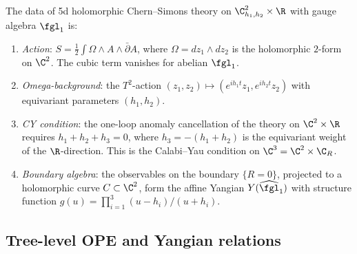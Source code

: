\begin{proposition}
\label{prop:5d-hcs-specification}
The data of 5d holomorphic Chern--Simons theory on $\C^2_{h_1,h_2} \times \R$ with gauge algebra $\fgl_1$ is:
\begin{enumerate}[label=\textup{(\alph*)}]
 \item \emph{Action}: $S = \frac{1}{2}\int \Omega \wedge A \wedge \bar{\partial}A$, where $\Omega = dz_1 \wedge dz_2$ is the holomorphic $2$-form on $\C^2$. The cubic term vanishes for abelian $\fgl_1$.
 \item \emph{Omega-background}: the $T^2$-action $(z_1, z_2) \mapsto (e^{ih_1 t}z_1, e^{ih_2 t}z_2)$ with equivariant parameters $(h_1, h_2)$.
 \item \emph{CY condition}: the one-loop anomaly cancellation of the theory on $\C^2 \times \R$ requires $h_1 + h_2 + h_3 = 0$, where $h_3 = -(h_1 + h_2)$ is the equivariant weight of the $\R$-direction. This is the Calabi--Yau condition on $\C^3 = \C^2 \times \C_R$.
 \item \emph{Boundary algebra}: the observables on the boundary $\{R = 0\}$, projected to a holomorphic curve $C \subset \C^2$, form the affine Yangian $Y(\widehat{\fgl}_1)$ with structure function $g(u) = \prod_{i=1}^{3}(u - h_i)/(u + h_i)$.
\end{enumerate}
\end{proposition}

\subsection{Tree-level OPE and Yangian relations}
\label{subsec:tree-level-ope}

